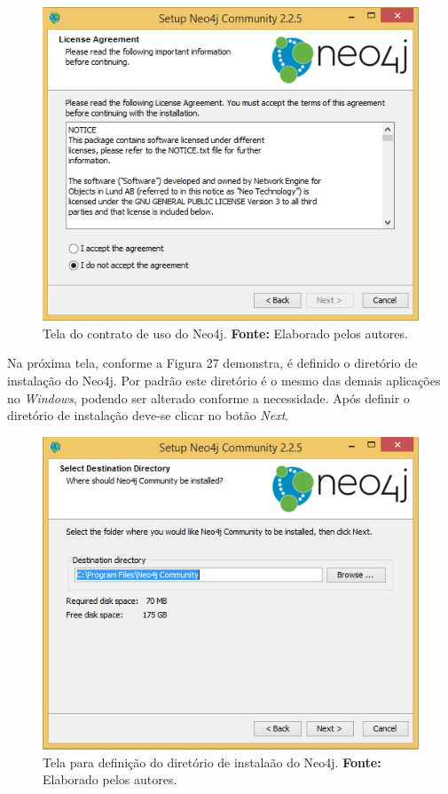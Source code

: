 \newpage
\begin{figure}[h!]
	\centerline{\includegraphics[scale=0.4]{./imagens/neo4j-install-step2.png}}
	\caption[Tela do contrato de uso do Neo4j]
	{Tela do contrato de uso do Neo4j. \textbf{Fonte:} Elaborado pelos autores.}
	\label{fig:exemplo1}
\end{figure}

\par Na próxima tela, conforme a Figura 27 demonstra, é definido o diretório de instalação do Neo4j. Por padrão este diretório é o mesmo das demais aplicações no \textit{Windows}, podendo ser alterado conforme a necessidade. Após definir o diretório de instalação deve-se clicar no botão \textit{Next}.

\begin{figure}[h!]
	\centerline{\includegraphics[scale=0.4]{./imagens/neo4j-install-step3.png}}
	\caption[Tela para definição do diretório de instalaão do Neo4j]
	{Tela para definição do diretório de instalaão do Neo4j. \textbf{Fonte:} Elaborado pelos autores.}
	\label{fig:exemplo1}
\end{figure}

